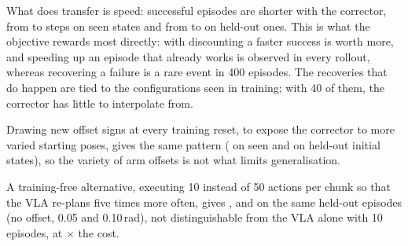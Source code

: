 What does transfer is speed: successful episodes are shorter with the corrector, from \RLStepsSeenVla{} to
\RLStepsSeenRes{} steps on seen states and from \RLStepsUnseenVla{} to \RLStepsUnseenRes{} on held-out
ones. This is what the objective rewards most directly: with discounting a faster success is worth more,
and speeding up an episode that already works is observed in every rollout, whereas recovering a failure
is a rare event in 400 episodes. The recoveries that do happen are tied to the configurations seen in
training; with 40 of them, the corrector has little to interpolate from.

Drawing new offset signs at every training reset, to expose the corrector to more varied starting poses,
gives the same pattern (\RLRandSeenRes{} on seen and \RLRandUnseenRes{} on held-out initial states), so the
variety of arm offsets is not what limits generalisation.

A training-free alternative, executing 10 instead of 50 actions per chunk so that the VLA re-plans five
times more often, gives \RLReplanClean{}, \RLReplanTrain{} and \RLReplanStrong{} on the same held-out
episodes (no offset, 0.05 and 0.10\,rad), not distinguishable from the VLA alone with 10 episodes, at
\RLReplanSlowdown{}$\times$ the cost.
